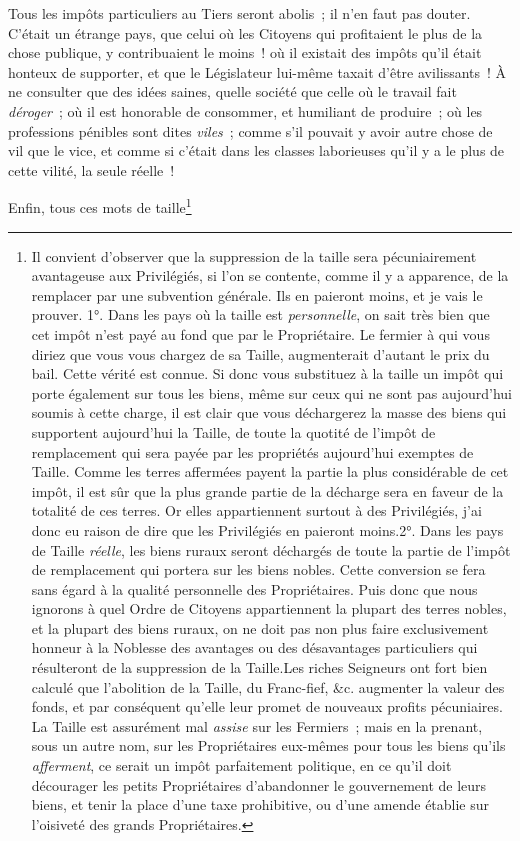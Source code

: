 \documentclass[french,twoside]{book} %
\begin{document}
Tous les impôts particuliers au Tiers seront abolis ; il n’en faut pas douter. C’était un étrange pays, que celui où les Citoyens qui profitaient le plus de la chose publique, y contribuaient le moins ! où il existait des impôts qu’il était honteux de supporter, et que le Législateur lui-même taxait d’être avilissants ! À ne consulter que des idées saines, quelle société que celle où le travail fait {\itshape déroger} ; où il est honorable de consommer, et humiliant de produire ; où les professions pénibles sont dites {\itshape viles} ; comme s’il pouvait y avoir autre chose de vil que le vice, et comme si c’était dans les classes laborieuses qu’il y a le plus de cette vilité, la seule réelle !\par
Enfin, tous ces mots de taille\footnote{\noindent Il convient d’observer que la suppression de la taille sera pécuniairement avantageuse aux Privilégiés, si l’on se contente, comme il y a apparence, de la remplacer par une subvention générale. Ils en paieront moins, et je vais le prouver. 1°. Dans les pays où la taille est {\itshape personnelle}, on sait très bien que cet impôt n’est payé au fond que par le Propriétaire. Le fermier à qui vous diriez que vous vous chargez de sa Taille, augmenterait d’autant le prix du bail. Cette vérité est connue. Si donc vous substituez à la taille un impôt qui porte également sur tous les biens, même sur ceux qui ne sont pas aujourd’hui soumis à cette charge, il est clair que vous déchargerez la masse des biens qui supportent aujourd’hui la Taille, de toute la quotité de l’impôt de remplacement qui sera payée par les propriétés aujourd’hui exemptes de Taille. Comme les terres affermées payent la partie la plus considérable de cet impôt, il est sûr que la plus grande partie de la décharge sera en faveur de la totalité de ces terres. Or elles appartiennent surtout à des Privilégiés, j’ai donc eu raison de dire que les Privilégiés en paieront moins.2°. Dans les pays de Taille {\itshape réelle}, les biens ruraux seront déchargés de toute la partie de l’impôt de remplacement qui portera sur les biens nobles. Cette conversion se fera sans égard à la qualité personnelle des Propriétaires. Puis donc que nous ignorons à quel Ordre de Citoyens appartiennent la plupart des terres nobles, et la plupart des biens ruraux, on ne doit pas non plus faire exclusivement honneur à la Noblesse des avantages ou des désavantages particuliers qui résulteront de la suppression de la Taille.Les riches Seigneurs ont fort bien calculé que l’abolition de la Taille, du Franc-fief, \&c. augmenter la valeur des fonds, et par conséquent qu’elle leur promet de nouveaux profits pécuniaires. La Taille est assurément mal {\itshape assise} sur les Fermiers ; mais en la prenant, sous un autre nom, sur les Propriétaires eux-mêmes pour tous les biens qu’ils {\itshape afferment}, ce serait un impôt parfaitement politique, en ce qu’il doit décourager les petits Propriétaires d’abandonner le gouvernement de leurs biens, et tenir la place d’une taxe prohibitive, ou d’une amende établie sur l’oisiveté des grands Propriétaires.\par
\par

}
\end{document}

